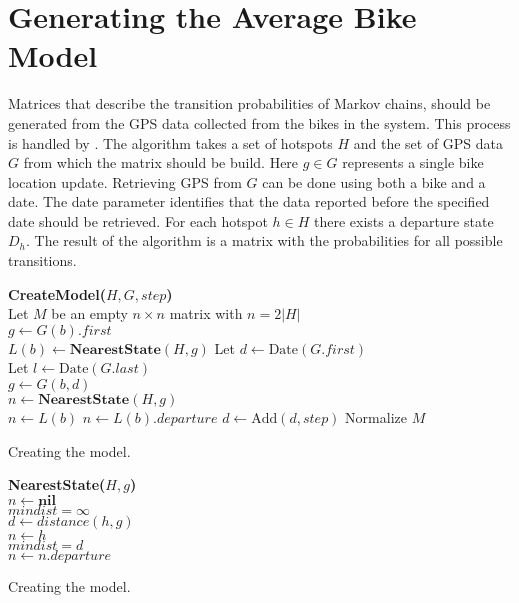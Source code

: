 \section{Generating the Average Bike Model}\label{sec:generatemarkov}
Matrices that describe the transition probabilities of Markov chains, should be generated from the GPS data collected from the bikes in the system.
This process is handled by .
The algorithm takes a set of hotspots $H$ and the set of GPS data $G$ from which the matrix should be build.
Here $g \in G$ represents a single bike location update.
Retrieving GPS from $G$ can be done using both a bike and a date.
The date parameter identifies that the data reported before the specified date should be retrieved.
For each hotspot $h \in H$ there exists a departure state $D_h$.
The result of the algorithm is a matrix with the probabilities for all possible transitions.

\begin{algorithm}
\SetAlgoNoEnd
\textbf{CreateModel($H, G, step$)}\\
Let $M$ be an empty $n \times n$ matrix with $n = 2|H|$ \\
	{
	$g \leftarrow G(b).first$\\
	$L(b) \leftarrow \textbf{NearestState}(H, g)$
	}
Let $d \leftarrow \text{Date}(G.first)$\\
Let $l \leftarrow \text{Date}(G.last)$\\
	{
		{
		$g \leftarrow G(b, d)$\\
		$n \leftarrow \textbf{NearestState}(H, g)$\\
			{
			$n \leftarrow L(b)$
			}
			{
			$n \leftarrow L(b).departure$
			}
		}
	$d \leftarrow \text{Add}(d, step)$
	}
Normalize $M$\\
\caption{Creating the model.}
\label{markov:alg:create_model}
\end{algorithm}

\begin{algorithm}
\SetAlgoNoEnd
\textbf{NearestState($H, g$)}\\
$n \leftarrow \textbf{nil}$\\
$mindist = \infty$\\
	{
	$d \leftarrow distance(h, g)$\\
		{
		$n \leftarrow h$\\
		$mindist = d$\\
		}
	}
	{
	$n \leftarrow n.departure$
	}
\caption{Creating the model.}
\label{markov:alg:nearest}
\end{algorithm}